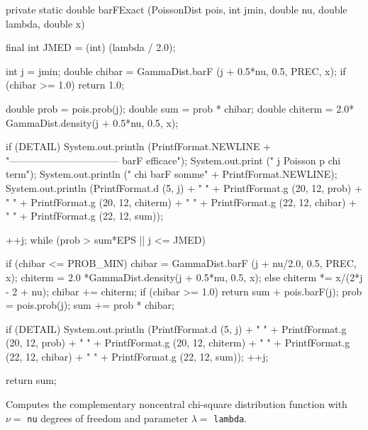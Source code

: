 \begin{code}
\begin{hide}
   private static double barFExact (PoissonDist pois, int jmin, double nu,
         double lambda, double x) {
      final int JMED = (int) (lambda / 2.0);

      int j = jmin;
      double chibar = GammaDist.barF (j + 0.5*nu, 0.5, PREC, x);
      if (chibar >= 1.0) return 1.0;

      double prob = pois.prob(j);
      double sum = prob * chibar;
      double chiterm = 2.0* GammaDist.density(j + 0.5*nu, 0.5, x);

      if (DETAIL) {
         System.out.println (PrintfFormat.NEWLINE +
              "--------------------------------- barF efficace");
         System.out.print ("   j                  Poisson p            chi term");
         System.out.println ("                chi barF                 somme" +
              PrintfFormat.NEWLINE);
         System.out.println (PrintfFormat.d (5, j) + "   " +
                             PrintfFormat.g (20, 12, prob) + "   " +
                             PrintfFormat.g (20, 12, chiterm) + "   " +
                             PrintfFormat.g (22, 12, chibar) + "   " +
                             PrintfFormat.g (22, 12, sum));
      }

      ++j;
      while (prob > sum*EPS || j <= JMED)
      {
         if (chibar <= PROB_MIN) {
             chibar = GammaDist.barF (j + nu/2.0, 0.5, PREC, x);
             chiterm = 2.0 *GammaDist.density(j + 0.5*nu, 0.5, x);
         } else {
            chiterm *= x/(2*j - 2 + nu);
            chibar += chiterm;
         }
         if (chibar >= 1.0)
            return sum + pois.barF(j);
         prob = pois.prob(j);
         sum += prob * chibar;

         if (DETAIL) {
            System.out.println (PrintfFormat.d (5, j) + "   " +
                                PrintfFormat.g (20, 12, prob) + "   " +
                                PrintfFormat.g (20, 12, chiterm) + "   " +
                                PrintfFormat.g (22, 12, chibar) + "   " +
                                PrintfFormat.g (22, 12, sum));
         }
         ++j;
      }
      return sum;
   }\end{hide}
\end{code}
\begin{tabb}
  Computes the complementary noncentral chi-square distribution function with
 $\nu = $ \texttt{nu} degrees of freedom and parameter  $\lambda = $
  \texttt{lambda}.
\end{tabb}
